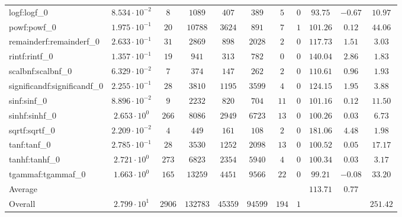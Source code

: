 \begin{tabular}{|l|c|c|c|c|c|c|c|c|c|c|}
logf:logf\_0                 & $ 8.534 \cdot 10^{-2} $ & $ 8      $ & $ 1089   $ & $ 407   $ & $ 389   $ & $ 5   $ & $ 0 $ & $ 93.75       $ & $ -0.67   $ & $ 10.97   $ \\
powf:powf\_0                 & $ 1.975 \cdot 10^{-1} $ & $ 20     $ & $ 10788  $ & $ 3624  $ & $ 891   $ & $ 7   $ & $ 1 $ & $ 101.26      $ & $ 0.12    $ & $ 44.06   $ \\
remainderf:remainderf\_0     & $ 2.633 \cdot 10^{-1} $ & $ 31     $ & $ 2869   $ & $ 898   $ & $ 2028  $ & $ 2   $ & $ 0 $ & $ 117.73      $ & $ 1.51    $ & $ 3.03    $ \\
rintf:rintf\_0               & $ 1.357 \cdot 10^{-1} $ & $ 19     $ & $ 941    $ & $ 313   $ & $ 782   $ & $ 0   $ & $ 0 $ & $ 140.04      $ & $ 2.86    $ & $ 1.83    $ \\
scalbnf:scalbnf\_0           & $ 6.329 \cdot 10^{-2} $ & $ 7      $ & $ 374    $ & $ 147   $ & $ 262   $ & $ 2   $ & $ 0 $ & $ 110.61      $ & $ 0.96    $ & $ 1.93    $ \\
significandf:significandf\_0 & $ 2.255 \cdot 10^{-1} $ & $ 28     $ & $ 3810   $ & $ 1195  $ & $ 3599  $ & $ 4   $ & $ 0 $ & $ 124.15      $ & $ 1.95    $ & $ 3.88    $ \\
sinf:sinf\_0                 & $ 8.896 \cdot 10^{-2} $ & $ 9      $ & $ 2232   $ & $ 820   $ & $ 704   $ & $ 11  $ & $ 0 $ & $ 101.16      $ & $ 0.12    $ & $ 11.50   $ \\
sinhf:sinhf\_0               & $ 2.653 \cdot 10^{0}  $ & $ 266    $ & $ 8086   $ & $ 2949  $ & $ 6723  $ & $ 13  $ & $ 0 $ & $ 100.26      $ & $ 0.03    $ & $ 6.73    $ \\
sqrtf:sqrtf\_0               & $ 2.209 \cdot 10^{-2} $ & $ 4      $ & $ 449    $ & $ 161   $ & $ 108   $ & $ 2   $ & $ 0 $ & $ 181.06      $ & $ 4.48    $ & $ 1.98    $ \\
tanf:tanf\_0                 & $ 2.785 \cdot 10^{-1} $ & $ 28     $ & $ 3530   $ & $ 1252  $ & $ 2098  $ & $ 13  $ & $ 0 $ & $ 100.52      $ & $ 0.05    $ & $ 17.17   $ \\
tanhf:tanhf\_0               & $ 2.721 \cdot 10^{0}  $ & $ 273    $ & $ 6823   $ & $ 2354  $ & $ 5940  $ & $ 4   $ & $ 0 $ & $ 100.34      $ & $ 0.03    $ & $ 3.17    $ \\
tgammaf:tgammaf\_0           & $ 1.663 \cdot 10^{0}  $ & $ 165    $ & $ 13259  $ & $ 4451  $ & $ 9566  $ & $ 22  $ & $ 0 $ & $ 99.21       $ & $ -0.08   $ & $ 33.20   $ \\
\hline
Average                      & $                     $ & $        $ & $        $ & $       $ & $       $ & $     $ & $   $ & $ 113.71      $ & $ 0.77    $ & $         $ \\
\hline
Overall                      & $ 2.799 \cdot 10^{1}  $ & $ 2906   $ & $ 132783 $ & $ 45359 $ & $ 94599 $ & $ 194 $ & $ 1 $ & $             $ & $         $ & $ 251.42  $ \\
\hline
\end{tabular}
